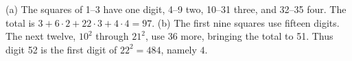(a) The squares of 1--3 have one digit, 4--9 two, 10--31 three, and 32--35 four. The total is $3+6\cdot2+22\cdot3+4\cdot4=\boxed{97}$. (b) The first nine squares use fifteen digits. The next twelve, $10^2$ through $21^2$, use 36 more, bringing the total to 51. Thus digit 52 is the first digit of $22^2=484$, namely $\boxed4$.
